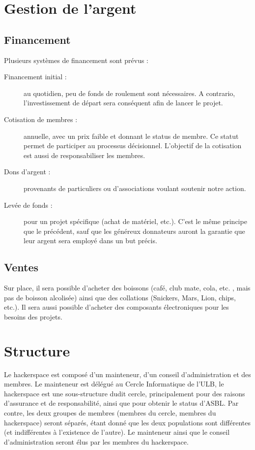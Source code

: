 \documentclass{article}
\begin{document}
\section{Gestion de l'argent}
\subsection{Financement}

Plusieurs systèmes de financement sont prévus :
\begin{description}
\item[Financement initial :] au quotidien, peu de fonds de roulement sont nécessaires. A contrario, l'investissement de départ sera conséquent afin de lancer le projet.
\item[Cotisation de membres :] annuelle, avec un prix faible et donnant le status de membre. 
Ce statut permet de participer au processus décisionnel. L'objectif de la cotisation est aussi de responsabiliser les membres.
\item[Dons d'argent :] provenants de particuliers ou d'associations voulant soutenir notre action.
\item[Levée de fonds :] pour un projet spécifique (achat de matériel, etc.). C'est 
le même principe que le précédent, sauf que les généreux donnateurs auront la 
garantie que leur argent sera employé dans un but précis.\end{description}

\subsection{Ventes}

Sur place, il sera possible d'acheter des boissons (café, club mate, cola, etc. , mais  
pas de boisson alcolisée) ainsi que des collations (Snickers, Mars, Lion, chips, etc.).
Il sera aussi possible d'acheter des composants électroniques pour les besoins des projets.


\section{Structure}

Le hackerspace est composé d'un mainteneur, d'un conseil d'administration et des membres.
Le mainteneur est délégué au Cercle Informatique de l'ULB, le hackerspace est 
une sous-structure dudit cercle, principalement pour des raisons d'assurance et
de responsabilité, ainsi que pour obtenir le status d'ASBL. Par contre, les deux groupes de 
membres (membres du cercle, membres du hackerspace) seront séparés, étant donné que 
les deux populations sont différentes (et indifférentes à l'existence de l'autre). 
Le mainteneur ainsi que le conseil d'administration seront élus par les 
membres du hackerspace.
\end{document}
